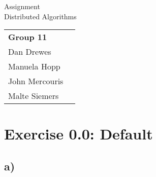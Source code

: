\documentclass[12pt,a4paper]{article}
\begin{document}
\begin{center}
  \Large Assignment  \\
  \large Distributed Algorithms
\end{center}
\begin{flushright}
  \begin{tabular}{ll}
    \textbf{Group 11} \\
    Dan Drewes        \\ 
    Manuela Hopp      \\ 
    John Mercouris    \\
    Malte Siemers     \\
  \end{tabular} 
\end{flushright}


\section*{Exercise 0.0: Default}
  \subsection*{a)} %
\end{document}
